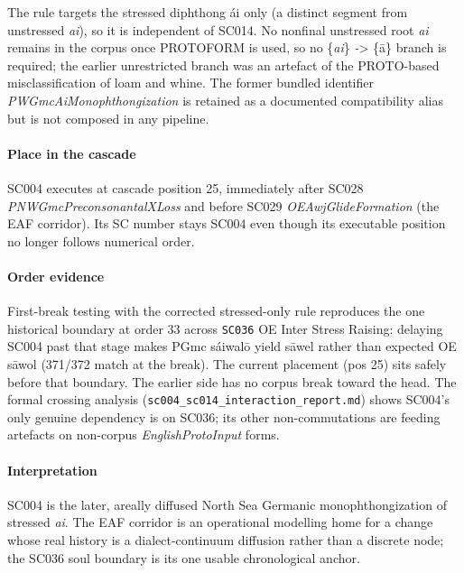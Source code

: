 \documentclass[
  british,
  a4paper,
]{article}
\begin{document}
The rule targets the stressed diphthong ái only (a distinct segment from
unstressed \emph{ai}), so it is independent of SC014. No nonfinal
unstressed root \emph{ai} remains in the corpus once PROTOFORM is used,
so no \{\emph{ai}\} \emph{-}\textgreater{} \{ā\} branch is required; the
earlier unrestricted branch was an artefact of the PROTO-based
misclassification of loam and whine. The former bundled identifier
\emph{PWGmcAiMonophthongization} is retained as a documented
compatibility alias but is not composed in any pipeline.

\paragraph{Place in the cascade}\label{place-in-the-cascade-1}

SC004 executes at cascade position 25, immediately after SC028
\emph{PNWGmcPreconsonantalXLoss} and before SC029
\emph{OEAwjGlideFormation} (the EAF corridor). Its SC number stays SC004
even though its executable position no longer follows numerical order.

\paragraph{Order evidence}\label{order-evidence-1}

First-break testing with the corrected stressed-only rule reproduces the
one historical boundary at order 33 across \texttt{SC036} OE Inter
Stress Raising: delaying SC004 past that stage makes PGmc sáiwalō yield
sāwel rather than expected OE sāwol (371/372 match at the break). The
current placement (pos 25) sits safely before that boundary. The earlier
side has no corpus break toward the head. The formal crossing analysis
(\texttt{sc004\_sc014\_interaction\_report.md}) shows SC004's only
genuine dependency is on SC036; its other non-commutations are feeding
artefacts on non-corpus \emph{EnglishProtoInput} forms.

\paragraph{Interpretation}\label{interpretation-1}

SC004 is the later, areally diffused North Sea Germanic
monophthongization of stressed \emph{ai}. The EAF corridor is an
operational modelling home for a change whose real history is a
dialect-continuum diffusion rather than a discrete node; the SC036 soul
boundary is its one usable chronological anchor.
\end{document}
